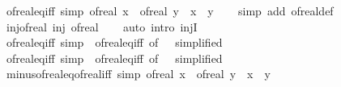 \begin{isabellebody}
\endisatagproof
{\isafoldproof}%
%
\isadelimproof
\isanewline
%
\endisadelimproof
\isanewline
{}\isamarkupfalse%
\ of{\isacharunderscore}{\kern0pt}real{\isacharunderscore}{\kern0pt}eq{\isacharunderscore}{\kern0pt}iff\ {\isacharbrackleft}{\kern0pt}simp{\isacharbrackright}{\kern0pt}{\isacharcolon}{\kern0pt}\ {\isachardoublequoteopen}of{\isacharunderscore}{\kern0pt}real\ x\ {\isacharequal}{\kern0pt}\ of{\isacharunderscore}{\kern0pt}real\ y\ {\isasymlongleftrightarrow}\ x\ {\isacharequal}{\kern0pt}\ y{\isachardoublequoteclose}\isanewline
%
\isadelimproof
\ \ %
\endisadelimproof
%
\isatagproof
{}\isamarkupfalse%
\ {\isacharparenleft}{\kern0pt}simp\ add{\isacharcolon}{\kern0pt}\ of{\isacharunderscore}{\kern0pt}real{\isacharunderscore}{\kern0pt}def{\isacharparenright}{\kern0pt}%
\endisatagproof
{\isafoldproof}%
%
\isadelimproof
\isanewline
%
\endisadelimproof
\isanewline
{}\isamarkupfalse%
\ inj{\isacharunderscore}{\kern0pt}of{\isacharunderscore}{\kern0pt}real{\isacharcolon}{\kern0pt}\ {\isachardoublequoteopen}inj\ of{\isacharunderscore}{\kern0pt}real{\isachardoublequoteclose}\isanewline
%
\isadelimproof
\ \ %
\endisadelimproof
%
\isatagproof
{}\isamarkupfalse%
\ {\isacharparenleft}{\kern0pt}auto\ intro{\isacharcolon}{\kern0pt}\ injI{\isacharparenright}{\kern0pt}%
\endisatagproof
{\isafoldproof}%
%
\isadelimproof
\isanewline
%
\endisadelimproof
\isanewline
{}\isamarkupfalse%
\ of{\isacharunderscore}{\kern0pt}real{\isacharunderscore}{\kern0pt}eq{\isacharunderscore}{\kern0pt}{}{\isacharunderscore}{\kern0pt}iff\ {\isacharbrackleft}{\kern0pt}simp{\isacharbrackright}{\kern0pt}\ {\isacharequal}{\kern0pt}\ of{\isacharunderscore}{\kern0pt}real{\isacharunderscore}{\kern0pt}eq{\isacharunderscore}{\kern0pt}iff\ {\isacharbrackleft}{\kern0pt}of\ {\isacharunderscore}{\kern0pt}\ {}{\isacharcomma}{\kern0pt}\ simplified{\isacharbrackright}{\kern0pt}\isanewline
{}\isamarkupfalse%
\ of{\isacharunderscore}{\kern0pt}real{\isacharunderscore}{\kern0pt}eq{\isacharunderscore}{\kern0pt}{}{\isacharunderscore}{\kern0pt}iff\ {\isacharbrackleft}{\kern0pt}simp{\isacharbrackright}{\kern0pt}\ {\isacharequal}{\kern0pt}\ of{\isacharunderscore}{\kern0pt}real{\isacharunderscore}{\kern0pt}eq{\isacharunderscore}{\kern0pt}iff\ {\isacharbrackleft}{\kern0pt}of\ {\isacharunderscore}{\kern0pt}\ {}{\isacharcomma}{\kern0pt}\ simplified{\isacharbrackright}{\kern0pt}\isanewline
\isanewline
{}\isamarkupfalse%
\ minus{\isacharunderscore}{\kern0pt}of{\isacharunderscore}{\kern0pt}real{\isacharunderscore}{\kern0pt}eq{\isacharunderscore}{\kern0pt}of{\isacharunderscore}{\kern0pt}real{\isacharunderscore}{\kern0pt}iff\ {\isacharbrackleft}{\kern0pt}simp{\isacharbrackright}{\kern0pt}{\isacharcolon}{\kern0pt}\ {\isachardoublequoteopen}{\isacharminus}{\kern0pt}of{\isacharunderscore}{\kern0pt}real\ x\ {\isacharequal}{\kern0pt}\ of{\isacharunderscore}{\kern0pt}real\ y\ {\isasymlongleftrightarrow}\ {\isacharminus}{\kern0pt}x\ {\isacharequal}{\kern0pt}\ y{\isachardoublequoteclose}\isanewline

\end{isabellebody}
